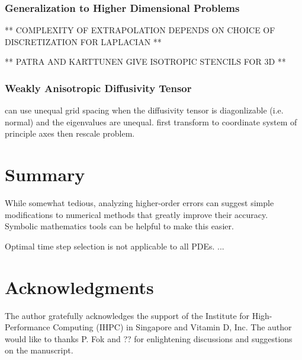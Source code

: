 \documentclass[oneeqnum,onefignum,onetabnum,onethmnum]{siamltex}
\begin{document}
\subsubsection{Generalization to Higher Dimensional Problems}
** COMPLEXITY OF EXTRAPOLATION DEPENDS ON CHOICE OF DISCRETIZATION FOR LAPLACIAN **

** PATRA AND KARTTUNEN GIVE ISOTROPIC STENCILS FOR 3D **


\subsubsection{Weakly Anisotropic Diffusivity Tensor}
can use unequal grid spacing when the diffusivity tensor is diagonlizable 
(i.e. normal) and the eigenvalues are unequal.  first transform to coordinate
system of principle axes then rescale problem.



\section{\label{sec:summary} Summary} 
While somewhat tedious, analyzing higher-order errors can suggest simple 
modifications to numerical methods that greatly improve their accuracy.  
Symbolic mathematics tools can be helpful to make this easier.

Optimal time step selection is not applicable to all PDEs.  ...


\section*{Acknowledgments}
The author gratefully acknowledges the support of the Institute for 
High-Performance Computing (IHPC) in Singapore and Vitamin D, Inc.
The author would like to thanks P. Fok and ?? for enlightening discussions 
and suggestions on the manuscript.


\end{document}
